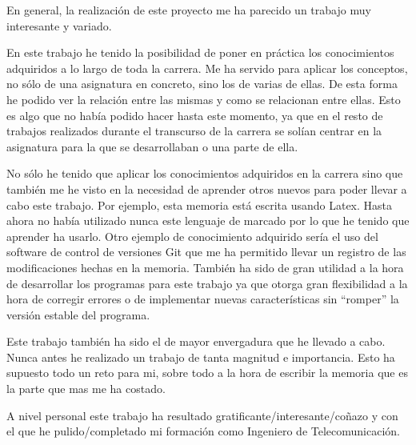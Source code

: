 En general, la realización de este proyecto me ha parecido un trabajo muy interesante y variado.



En este trabajo he tenido la posibilidad de poner en práctica los conocimientos adquiridos a lo largo de toda la carrera. Me ha servido para aplicar los conceptos, no sólo de una asignatura en concreto, sino los de varias de ellas. De esta forma he podido ver la relación entre las mismas y como se relacionan entre ellas. Esto es algo que no había podido hacer hasta este momento, ya que en el resto 
de trabajos realizados durante el transcurso de la carrera se solían centrar en la asignatura para la que se desarrollaban o una parte de ella.


No sólo he tenido que aplicar los conocimientos adquiridos en la carrera sino que también me he visto en la necesidad de aprender otros nuevos para poder llevar a cabo este trabajo. Por ejemplo, esta memoria está escrita usando Latex. Hasta ahora no había utilizado nunca este lenguaje de marcado por lo que he tenido que aprender ha usarlo. Otro ejemplo de conocimiento adquirido sería el uso del software de control de versiones Git que me ha permitido llevar un registro de las modificaciones hechas en la memoria. También ha sido de gran utilidad a la hora de desarrollar los programas para este trabajo ya que otorga gran flexibilidad a la hora de corregir errores o de implementar nuevas características sin “romper” la versión estable del programa.

Este trabajo también ha sido el de mayor envergadura que he llevado a cabo. Nunca antes he realizado un trabajo de tanta magnitud e importancia. Esto ha supuesto todo un reto para mi, sobre todo a la hora de escribir la memoria que es la parte que mas me ha costado.

A nivel personal este trabajo ha resultado gratificante/interesante/coñazo y con el que he pulido/completado mi formación como Ingeniero de Telecomunicación.
